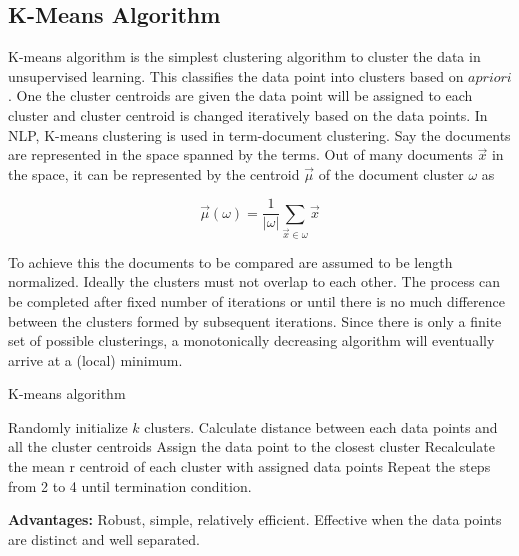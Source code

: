 \documentclass{bmcart}
\begin{document}
\subsection{K-Means Algorithm}
\label{ssec:kmeans}
 K-means algorithm is the simplest clustering algorithm to cluster the data in unsupervised learning. This classifies the data point into clusters based on $apriori$. One the cluster centroids are given the data point will be assigned to each cluster and cluster centroid is changed iteratively based on the data points. In NLP, K-means clustering is used in term-document clustering. Say the documents are represented in the space spanned by the terms. Out of many documents $\vec{x}$ in the space, it can be represented by the centroid $\vec{\mu}$ of the document cluster $\omega$ as
 \begin{center}
 \begin{equation}
 \vec{\mu}(\omega)=\frac{1}{|\omega |}\sum_{\vec{x}\in \omega}{\vec{x}}
 \end{equation}
 \label{eqn:kmeans_mu}
 \end{center}
  
To achieve this the documents to be compared are assumed to be length normalized. Ideally the clusters must not overlap to each other. The process can be completed after fixed number of iterations or until there is no much difference between the clusters formed by subsequent iterations. Since there is only a finite set of possible clusterings, a monotonically decreasing algorithm will eventually arrive at a (local) minimum. 

\begin{algorithm}[h!tb]
\caption{K-means algorithm}
\label{algo:kmeans}
\begin{algorithmic}[1]

\STATE {}
\STATE Randomly initialize $k$ clusters.
\STATE Calculate distance between each data points and all the cluster centroids
\STATE Assign the data point to the closest cluster
\STATE Recalculate the mean r centroid of each cluster with assigned data points
\STATE Repeat the steps from 2 to 4 until termination condition.
\end{algorithmic}
\end{algorithm}

{\bf Advantages:} Robust, simple, relatively efficient. Effective when the data points are distinct and well separated. 
\end{document}
